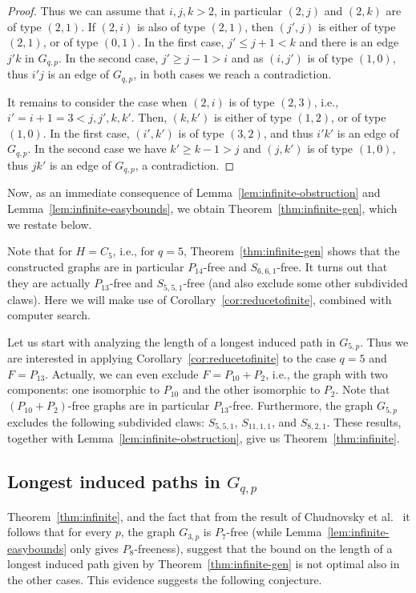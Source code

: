 \documentclass[11pt,a4paper]{article}
\theoremstyle{mystyle}
\begin{document}
\begin{proof}
Thus we can assume that $i,j,k >2$, in particular $(2,j)$ and $(2,k)$ are of type $(2,1)$.
If $(2,i)$ is also of type $(2,1)$, then $(j',j)$ is either of type $(2,1)$, or of type $(0,1)$.
In the first case, $j'\leq j+1<k$ and there is an edge $j'k$ in $G_{q,p}$.
In the second case, $j'\geq j-1>i$ and as $(i,j')$ is of type $(1,0)$, thus $i'j$ is an edge of $G_{q,p}$, in both cases we reach a contradiction.

It remains to consider the case when $(2,i)$ is of type $(2,3)$, i.e., $i'=i+1=3 < j,j',k,k'$.
Then, $(k,k')$ is either of type $(1,2)$, or of type $(1,0)$. In the first case, $(i',k')$ is of type $(3,2)$, and thus $i'k'$ is an edge of $G_{q,p}$.
In the second case we have $k'\geq k-1 >j$ and $(j,k')$ is of type $(1,0)$, thus $jk'$ is an edge of $G_{q,p}$, a contradiction.
\end{proof}
Now, as an immediate consequence of Lemma~\ref{lem:infinite-obstruction} and Lemma~\ref{lem:infinite-easybounds}, we obtain Theorem~\ref{thm:infinite-gen}, which we restate below.

\thminfinitepathsgen*


Note that for $H = C_5$, i.e., for $q=5$, Theorem~\ref{thm:infinite-gen} shows that the constructed graphs are in particular $P_{14}$-free and $S_{6,6,1}$-free.
It turns out that they are actually $P_{13}$-free and $S_{5,5,1}$-free (and also exclude some other subdivided claws). Here we will make use of Corollary~\ref{cor:reducetofinite}, combined with computer search.

Let us start with analyzing the length of a longest induced path in $G_{5,p}$.
Thus we are interested in applying  Corollary~\ref{cor:reducetofinite} to the case $q=5$ and $F=P_{13}$. Actually,  we can even exclude $F=P_{10}+P_2$, i.e., the graph with two components: one isomorphic to $P_{10}$ and the other isomorphic to $P_2$.
Note that $(P_{10}+P_2)$-free graphs are in particular $P_{13}$-free.
Furthermore, the graph $G_{5,p}$ excludes the following subdivided claws: $S_{5,5,1}$, $S_{11,1,1}$, and $S_{8,2,1}$.
These results, together with Lemma~\ref{lem:infinite-obstruction}, give us Theorem~\ref{thm:infinite}.

\thminfinite*

\subsection{Longest induced paths in $G_{q,p}$}

Theorem~\ref{thm:infinite}, and the fact that from the result of Chudnovsky et al.~\cite{DBLP:journals/jct/ChudnovskyGSZ20}
it follows that for every $p$, the graph $G_{3,p}$ is $P_7$-free (while Lemma~\ref{lem:infinite-easybounds} only gives $P_8$-freeness),
suggest that the bound on the length of a longest induced path given by Theorem~\ref{thm:infinite-gen} is not optimal also in the other cases. This evidence suggests the following conjecture.
\end{document}
